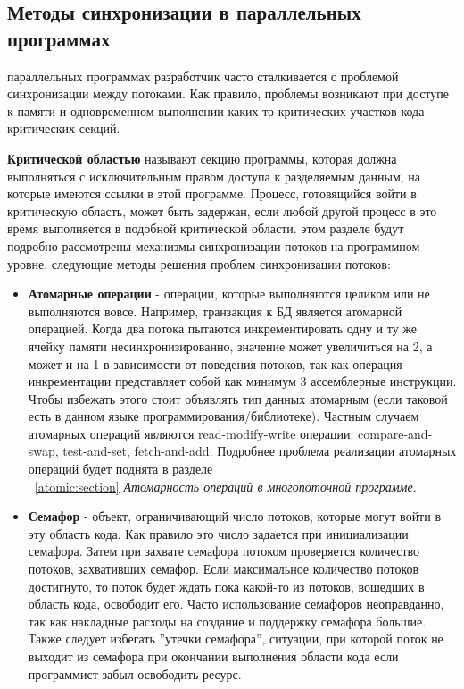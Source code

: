 { %
	\subsection{Методы синхронизации в параллельных программах}
	 параллельных программах разработчик часто сталкивается с проблемой синхронизации между потоками. Как правило, проблемы возникают при доступе к памяти и одновременном выполнении каких-то критических участков кода - критических секций.
	\par\textbf{Критической областью} называют секцию программы, которая должна выполняться с исключительным правом доступа к разделяемым данным, на которые имеются ссылки в этой программе. Процесс, готовящийся войти в критическую область, может быть задержан, если любой другой процесс в это время выполняется в подобной критической области.
	 этом разделе будут подробно рассмотрены механизмы синхронизации потоков на программном уровне.
	 следующие методы решения проблем синхронизации потоков:
		\begin{itemize}
			\item\textbf{Атомарные операции} - операции, которые выполняются целиком или не выполняются вовсе. Например, транзакция к БД является атомарной операцией. Когда два потока пытаются инкрементировать одну и ту же ячейку памяти несинхронизированно, значение может увеличиться на 2, а может и на 1 в зависимости от поведения потоков, так как операция инкрементации представляет собой как минимум 3 ассемблерные инструкции. Чтобы избежать этого стоит объявлять тип данных атомарным (если таковой есть в данном языке программирования/библиотеке). Частным случаем атомарных операций являются read-modify-write операции: compare-and-swap, test-and-set, fetch-and-add. Подробнее проблема реализации атомарных операций будет поднята в разделе\\~\ref{atomic:section} \textit{Атомарность операций в многопоточной программе}.
			\item\textbf{Семафор} - объект, ограничивающий число потоков, которые могут войти в эту область кода. Как правило это число задается при инициализации семафора. Затем при захвате семафора потоком проверяется количество потоков, захвативших семафор. Если максимальное количество потоков достигнуто, то поток будет ждать пока какой-то из потоков, вошедших в область кода, освободит его. Часто использование семафоров неоправданно, так как накладные расходы на создание и поддержку семафора большие. Также следует избегать ''утечки семафора'', ситуации, при которой поток не выходит из семафора при окончании выполнения области кода если программист забыл освободить ресурс.

\end{itemize}}
